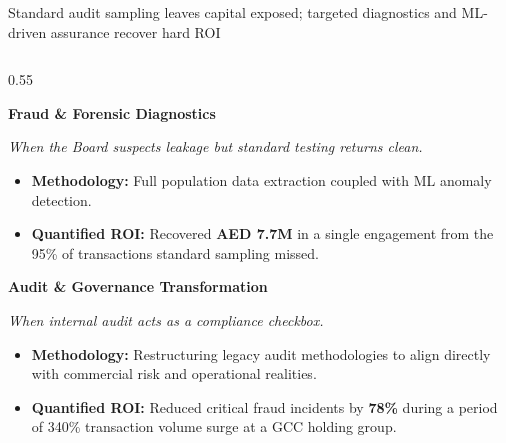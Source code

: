 \documentclass[aspectratio=169, 9pt]{beamer}
\begin{document}
\begin{frame}{Standard audit sampling leaves capital exposed; targeted diagnostics and ML-driven assurance recover hard ROI}
    \begin{columns}[T]
        \begin{column}{0.55\textwidth}
            \begin{tcolorbox}[colback=bcgLightGray, colframe=bcgLightGray, arc=0pt, left=5pt, top=3pt, bottom=3pt]
                \textbf{\normalsize \color{bcgGreen} Fraud \& Forensic Diagnostics}
            \end{tcolorbox}
            \textit{\small \color{gray} When the Board suspects leakage but standard testing returns clean.}
            \vspace{0.1cm}
            \begin{itemize}
                \item \textbf{Methodology:} Full population data extraction coupled with ML anomaly detection.
                \item \textbf{\color{bcgGreen} Quantified ROI:} Recovered \textbf{AED 7.7M} in a single engagement from the 95\% of transactions standard sampling missed.
            \end{itemize}
            
            \vspace{0.2cm}
            \begin{tcolorbox}[colback=bcgLightGray, colframe=bcgLightGray, arc=0pt, left=5pt, top=3pt, bottom=3pt]
                \textbf{\normalsize \color{bcgGreen} Audit \& Governance Transformation}
            \end{tcolorbox}
            \textit{\small \color{gray} When internal audit acts as a compliance checkbox.}
            \vspace{0.1cm}
            \begin{itemize}
                \item \textbf{Methodology:} Restructuring legacy audit methodologies to align directly with commercial risk and operational realities.
                \item \textbf{\color{bcgGreen} Quantified ROI:} Reduced critical fraud incidents by \textbf{78\%} during a period of 340\% transaction volume surge at a GCC holding group.
            \end{itemize}
        \end{column}
        

\end{columns}
\end{frame}
\end{document}
